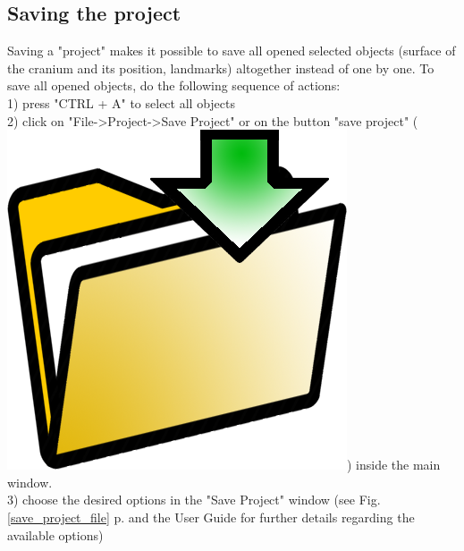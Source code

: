 \documentclass[12pt, a4paper]{book}
\begin{document}
\subsection{Saving the project}
Saving a "project" makes it possible to save all opened selected objects (surface of the cranium and its position, landmarks) altogether instead of one by one. 
To save all opened objects, do the following sequence of actions:\\
1) press "CTRL + A" to select all objects\\
2) click on "File->Project->Save Project" or on the button "save project" (\includegraphics[scale=0.03]{../images/03/save_data.png})  inside the main window.\\
3) choose the desired options in the "Save Project" window (see Fig. \ref{save_project_file} p.\pageref{save_project_file} and the User Guide for further details regarding the available options)
\end{document}
